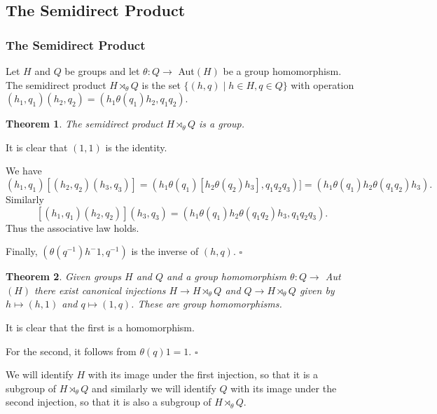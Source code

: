 \documentclass[10pt]{article}
\newtheorem{theorem}{Theorem}[section]
\newenvironment{proof}[1][Proof]{\begin{trivlist}
\item[\hskip \labelsep {\itshape #1}]}{\end{trivlist}}
\newenvironment{definition}[1][Definition]{\begin{trivlist}
\item[\hskip \labelsep {\bfseries #1}]}{\end{trivlist}}
\begin{document}
\subsection{The Semidirect Product}

\subsubsection{The Semidirect Product}

\begin{definition}
Let $H$ and $Q$ be groups and let $\theta : Q \to$ Aut$(H)$ be a group homomorphism. The semidirect product $H\rtimes_{\theta} Q$ is the set $\{(h, q)\;|\; h \in H, q \in Q\}$ with operation $(h_1, q_1)(h_2, q_2) = (h_1\theta(q_1)h_2, q_1q_2)$.
\end{definition}

\begin{theorem}
The semidirect product $H\rtimes_{\theta} Q$ is a group.
\end{theorem}

\begin{proof}
It is clear that $(1, 1)$ is the identity.

We have
$$(h_1, q_1)[(h_2, q_2)(h_3, q_3)] = (h_1\theta(q_1)[h_2\theta(q_2)h_3], q_1q_2q_3)] = (h_1\theta(q_1)h_2\theta(q_1q_2)h_3).$$
Similarly
$$[(h_1, q_1)(h_2, q_2)](h_3, q_3) = (h_1\theta(q_1)h_2\theta(q_1q_2)h_3, q_1q_2q_3).$$
Thus the associative law holds.

Finally, $(\theta(q^{-1})h^-1, q^{-1})$ is the inverse of $(h, q)$.
$\square$
\end{proof}

\begin{theorem}
Given groups $H$ and $Q$ and a group homomorphism $\theta : Q \to$ Aut$(H)$ there exist canonical injections $H \to H\rtimes_{\theta} Q$ and $Q \to H\rtimes_{\theta} Q$ given by $h \mapsto (h, 1)$ and $q \mapsto (1, q)$. These are group homomorphisms.
\end{theorem}

\begin{proof}
It is clear that the first is a homomorphism.

For the second, it follows from $\theta(q)1 = 1$. $\square$
\end{proof}

We will identify $H$ with its image under the first injection, so that it is a subgroup of $H\rtimes_{\theta} Q$ and similarly we will identify $Q$ with its image under the second injection, so that it is also a subgroup of $H\rtimes_{\theta} Q$.
\end{document}
